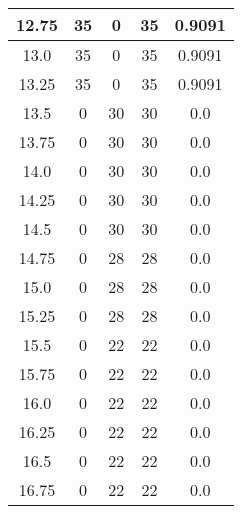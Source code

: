 \documentclass[letterpaper, 12pt]{article}
\begin{document}
\begin{longtable}{|c|c|c|c|c|}
\hline
12.75 & 35 & 0 & 35 & 0.9091 \\
\hline
13.0 & 35 & 0 & 35 & 0.9091 \\
\hline
13.25 & 35 & 0 & 35 & 0.9091 \\
\hline
13.5 & 0 & 30 & 30 & 0.0 \\
\hline
13.75 & 0 & 30 & 30 & 0.0 \\
\hline
14.0 & 0 & 30 & 30 & 0.0 \\
\hline
14.25 & 0 & 30 & 30 & 0.0 \\
\hline
14.5 & 0 & 30 & 30 & 0.0 \\
\hline
14.75 & 0 & 28 & 28 & 0.0 \\
\hline
15.0 & 0 & 28 & 28 & 0.0 \\
\hline
15.25 & 0 & 28 & 28 & 0.0 \\
\hline
15.5 & 0 & 22 & 22 & 0.0 \\
\hline
15.75 & 0 & 22 & 22 & 0.0 \\
\hline
16.0 & 0 & 22 & 22 & 0.0 \\
\hline
16.25 & 0 & 22 & 22 & 0.0 \\
\hline
16.5 & 0 & 22 & 22 & 0.0 \\
\hline
16.75 & 0 & 22 & 22 & 0.0 \\
\hline
\end{longtable}
\end{document}
